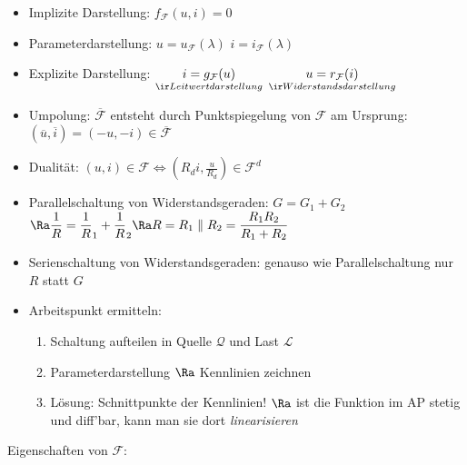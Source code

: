 \documentclass[fs, footer]{latex4ei}
\begin{document}
\begin{multicols*}{4}
{        \begin{itemize}
            \item Implizite Darstellung: $f_{\mathcal F} (u,i) = 0$
            \item Parameterdarstellung: $u = u_{\mathcal F} ( \lambda )$ \quad $ i = i_{\mathcal F} (\lambda )$
            \item Explizite Darstellung: $\underset{\ir Leitwertdarstellung}{i = g_{\mathcal F} (u)}$ \quad $\underset{\ir Widerstandsdarstellung}{u = r_{\mathcal F} (i)}$
            \item Umpolung: $\overline {\mathcal F}$ entsteht durch Punktspiegelung von $\mathcal F$ am Ursprung: $(\overline u, \overline i) = (- u, - i) \in \overline {\mathcal F}$
            \item Dualität: $(u,i) \in \mathcal F \Leftrightarrow ( R_d i, \frac{ u}{ R_d}) \in {\mathcal F}^d$
            \item Parallelschaltung von Widerstandsgeraden: $G = G_1 + G_2$ \\
                  $\Ra \frac 1 R = \frac 1 R_1 + \frac 1 R_2 \Ra R = R_1 \parallel R_2 = \frac{R_1 R_2}{R_1 + R_2}$
            \item Serienschaltung von Widerstandsgeraden: genauso wie Parallelschaltung nur $R$ statt $G$
            \item Arbeitspunkt ermitteln:
                  \begin{enumerate}
                      \item Schaltung aufteilen in Quelle $\mathcal Q$ und Last $\mathcal L$
                      \item Parameterdarstellung $\Ra$ Kennlinien zeichnen
                      \item Lösung: Schnittpunkte der Kennlinien! $\Ra$ ist die Funktion im AP stetig und diff'bar, kann man sie dort \emph{linearisieren}
                  \end{enumerate}
        \end{itemize}

        Eigenschaften von $\mathcal F$:

}
\end{multicols*}
\end{document}
